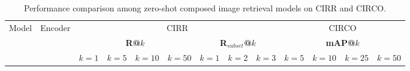 \begin{table*}
    \scriptsize
    \centering
    \caption{Performance comparison among zero-shot composed image retrieval models on CIRR and CIRCO.}
    \begin{tabular}{l|c|cccc|ccc|cccc}
    \hline 
    \multirow{3}{*}{Model} & \multirow{3}{*}{Encoder} & \multicolumn{7}{c|}{CIRR} & \multicolumn{4}{c}{CIRCO}  \\ 
    \cline{3-13}
    && \multicolumn{4}{c|}{\textbf{R@$k$}} & \multicolumn{3}{c|}{\textbf{R$_{subset}$@$k$}} & \multicolumn{4}{c}{\textbf{mAP@$k$}}\\
    \cline{3-13}
    & & $k=1$ & $k=5$ & $k=10$ & $k=50$ & $k=1$ & $k=2$ & $k=3$ & $k=5$ & $k=10$ & $k=25$ & $k=50$ \\
    \hline \hline
    

\end{tabular}
\end{table*}
